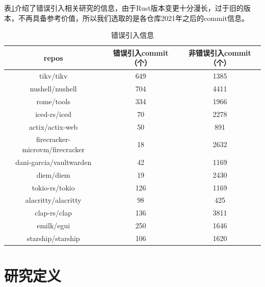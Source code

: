 表\ref{tab:bug-introduce-info}介绍了错误引入相关研究的信息，由于Rust版本变更十分漫长，过于旧的版本，不再具备参考价值，所以我们选取的是各仓库2021年之后的commit信息。

\begin{table}[ht]
	\centering
        \caption{错误引入信息}
	\begin{tabular}{ccc}
        \toprule
		\textbf{repos}                             & \textbf{错误引入commit（个）} & \textbf{非错误引入commit（个）} \\
        \midrule
		tikv/tikv                         & 649        & 1385        \\
		nushell/nushell                   & 704        & 4411        \\
		rome/tools                        & 334        & 1966        \\
		iced-rs/iced                      & 70         & 2278        \\
		  actix/actix-web                 & 50         & 891         \\
		  firecracker-microvm/firecracker & 18         & 2632        \\
		  dani-garcia/vaultwarden         & 42         & 1169        \\
		  diem/diem                       & 19         & 2430        \\
		tokio-rs/tokio                    & 126        & 1169        \\
		  alacritty/alacritty             & 98         & 425         \\
		  clap-rs/clap                    & 136        & 3811        \\
		emilk/egui                        & 250        & 1646        \\
		starship/starship                 & 106        & 1620 \\
        \bottomrule
	\end{tabular}
	\label{tab:bug-introduce-info}
\end{table}

\section{研究定义}

